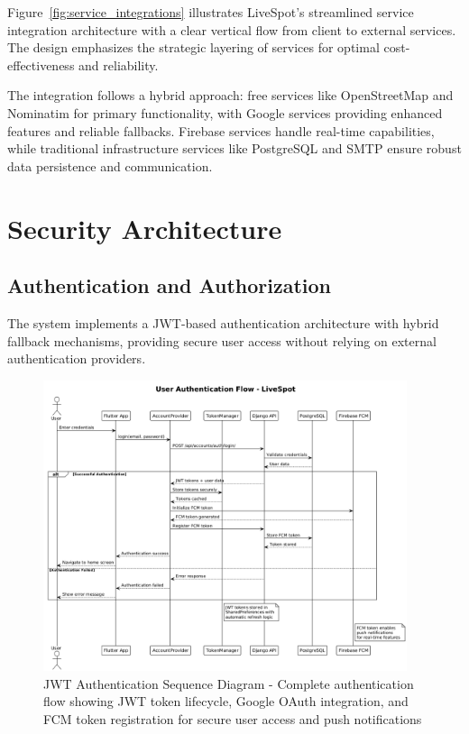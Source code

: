 Figure~\ref{fig:service_integrations} illustrates LiveSpot's streamlined service integration architecture with a clear vertical flow from client to external services. The design emphasizes the strategic layering of services for optimal cost-effectiveness and reliability.

The integration follows a hybrid approach: free services like OpenStreetMap and Nominatim for primary functionality, with Google services providing enhanced features and reliable fallbacks. Firebase services handle real-time capabilities, while traditional infrastructure services like PostgreSQL and SMTP ensure robust data persistence and communication.

\section{Security Architecture}
\label{sec:security_architecture}

\subsection{Authentication and Authorization}

The system implements a JWT-based authentication architecture with hybrid fallback mechanisms, providing secure user access without relying on external authentication providers.

\begin{figure}[h!]
    \centering
    \includegraphics[width=0.95\textwidth]{figures/authentication_sequence}
    \caption{JWT Authentication Sequence Diagram - Complete authentication flow showing JWT token lifecycle, Google OAuth integration, and FCM token registration for secure user access and push notifications}
    \label{fig:auth_flow}
\end{figure}

